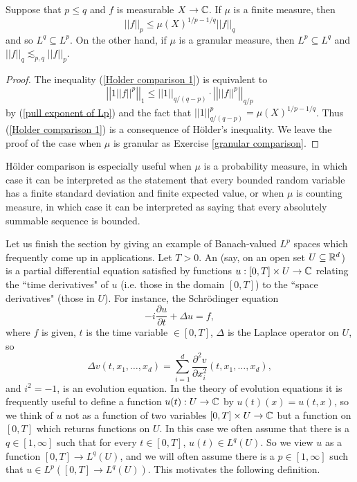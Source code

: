 \begin{corollary}
\label{Holder comparison}
Suppose that $p \leq q$ and $f$ is measurable $X \to \mathbb{C}$.
If $\mu$ is a finite measure, then
\begin{equation}
\label{Holder comparison 1}
||f||_p \leq \mu(X)^{1/p-1/q} ||f||_q
\end{equation}
and so $L^q \subseteq L^p$.
On the other hand, if $\mu$ is a granular measure, then $L^p \subseteq L^q$ and $||f||_q \lesssim_{p,q} ||f||_p$.
\end{corollary}
\begin{proof}
The inequality (\ref{Holder comparison 1}) is equivalent to
$$\left|\left|1 ||f||^p\right|\right|_1 \leq ||1||_{q/(q-p)} \cdot \left|\left| ||f||^p\right|\right|_{q/p}$$
by (\ref{pull exponent of Lp}) and the fact that $||1||_{q/(q-p)}^p = \mu(X)^{1/p-1/q}$.
Thus (\ref{Holder comparison 1}) is a consequence of H\"older's inequality.
We leave the proof of the case when $\mu$ is granular as Exercise \ref{granular comparison}.
\end{proof}

H\"older comparison is especially useful when $\mu$ is a probability measure, in which case it can be interpreted as the statement that every bounded random variable has a finite standard deviation and finite expected value, or when $\mu$ is counting measure, in which case it can be interpreted as saying that every absolutely summable sequence is bounded.

Let us finish the section by giving an example of Banach-valued $L^p$ spaces which frequently come up in applications.
Let $T > 0$. An  (say, on an open set $U \subseteq \mathbb{R}^d$) is a partial differential equation satisfied by functions $u: [0, T] \times U \to \mathbb{C}$ relating the ``time derivatives" of $u$ (i.e. those in the domain $[0, T]$) to the ``space derivatives" (those in $U$).
For instance, the Schr\"odinger equation
$$-i\frac{\partial u}{\partial t} + \Delta u = f,$$
where $f$ is given, $t$ is the time variable $\in [0, T]$, $\Delta$ is the Laplace operator on $U$, so
$$\Delta v(t, x_1, \dots, x_d) = \sum_{i=1}^d \frac{\partial^2 v}{\partial x_i^2} (t, x_1, \dots, x_d), $$
and $i^2 = -1$, is an evolution equation.
In the theory of evolution equations it is frequently useful to define a function $u(t): U \to \mathbb{C}$ by $u(t)(x) = u(t, x)$, so we think of $u$ not as a function of two variables $[0, T] \times U \to \mathbb{C}$ but a function on $[0, T]$ which returns functions on $U$.
In this case we often assume that there is a $q \in [1, \infty]$ such that for every $t \in [0, T]$, $u(t) \in L^q(U)$.
So we view $u$ as a function $[0, T] \to L^q(U)$, and we will often assume there is a $p \in [1, \infty]$ such that $u \in L^p([0, T] \to L^q(U))$.
This motivates the following definition.

